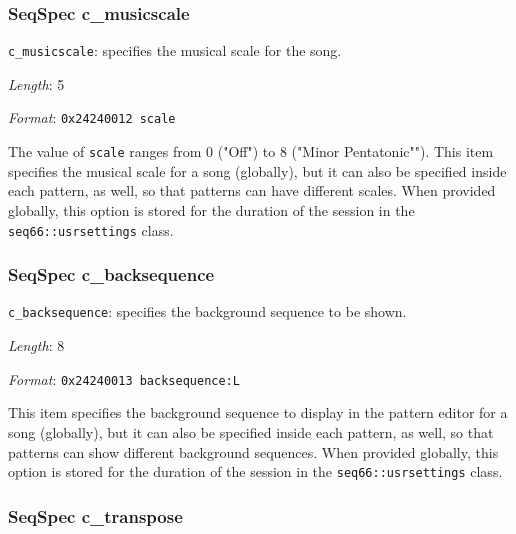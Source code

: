 \subsubsection{SeqSpec c\_musicscale}
\label{subsubsec:midi_format_track_seqspec_musicscale}

   \begin{description}
      \item \texttt{c\_musicscale}: specifies the musical scale for the song.
      \item \textsl{Length}: 5
      \item \textsl{Format}: \texttt{0x24240012 scale}
   \end{description}

   The value of \texttt{scale} ranges from 0 ("Off") to 8 ("Minor Pentatonic"").
   This item specifies the musical scale for a song (globally), but it
   can also be specified inside each pattern, as well, so that patterns
   can have different scales.
   When provided globally, this option is stored for the duration
   of the session in the
   \texttt{seq66::usrsettings} class.

\subsubsection{SeqSpec c\_backsequence}
\label{subsubsec:midi_format_track_seqspec_backsequence}

   \begin{description}
      \item \texttt{c\_backsequence}:
         specifies the background sequence to be shown.
      \item \textsl{Length}: 8
      \item \textsl{Format}: \texttt{0x24240013 backsequence:L}
   \end{description}

   This item specifies the background sequence to display in the pattern
   editor for a song (globally), but it
   can also be specified inside each pattern, as well, so that patterns
   can show different background sequences.
   When provided globally, this option is stored for the duration
   of the session in the
   \texttt{seq66::usrsettings} class.

\subsubsection{SeqSpec c\_transpose}
\label{subsubsec:midi_format_track_seqspec_transpose}

